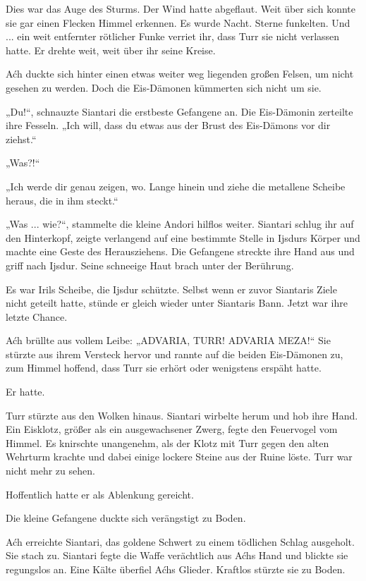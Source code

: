 Dies war das Auge des Sturms. Der Wind hatte abgeflaut. Weit über sich konnte sie gar einen Flecken Himmel erkennen. Es wurde Nacht. Sterne funkelten. Und ... ein weit entfernter rötlicher Funke verriet ihr, dass Turr sie nicht verlassen hatte. Er drehte weit, weit über ihr seine Kreise.

Aćh duckte sich hinter einen etwas weiter weg liegenden großen Felsen, um nicht gesehen zu werden. Doch die Eis-Dämonen kümmerten sich nicht um sie.

„Du!“, schnauzte Siantari die erstbeste Gefangene an. Die Eis-Dämonin zerteilte ihre Fesseln. „Ich will, dass du etwas aus der Brust des Eis-Dämons vor dir ziehst.“

„Was?!“

„Ich werde dir genau zeigen, wo. Lange hinein und ziehe die metallene Scheibe heraus, die in ihm steckt.“

„Was ... wie?“, stammelte die kleine Andori hilflos weiter. Siantari schlug ihr auf den Hinterkopf, zeigte verlangend auf eine bestimmte Stelle in Ijsdurs Körper und machte eine Geste des Herausziehens. Die Gefangene streckte ihre Hand aus und griff nach Ijsdur. Seine schneeige Haut brach unter der Berührung.

Es war Irils Scheibe, die Ijsdur schützte. Selbst wenn er zuvor Siantaris Ziele nicht geteilt hatte, stünde er gleich wieder unter Siantaris Bann. Jetzt war ihre letzte Chance.

Aćh brüllte aus vollem Leibe: „ADVARIA, TURR! ADVARIA MEZA!“ Sie stürzte aus ihrem Versteck hervor und rannte auf die beiden Eis-Dämonen zu, zum Himmel hoffend, dass Turr sie erhört oder wenigstens erspäht hatte.

Er hatte.

Turr stürzte aus den Wolken hinaus. Siantari wirbelte herum und hob ihre Hand. Ein Eisklotz, größer als ein ausgewachsener Zwerg, fegte den Feuervogel vom Himmel. Es knirschte unangenehm, als der Klotz mit Turr gegen den alten Wehrturm krachte und dabei einige lockere Steine aus der Ruine löste. Turr war nicht mehr zu sehen.

Hoffentlich hatte er als Ablenkung gereicht.

Die kleine Gefangene duckte sich verängstigt zu Boden.

Aćh erreichte Siantari, das goldene Schwert zu einem tödlichen Schlag ausgeholt. Sie stach zu. Siantari fegte die Waffe verächtlich aus Aćhs Hand und blickte sie regungslos an. Eine Kälte überfiel Aćhs Glieder. Kraftlos stürzte sie zu Boden.

